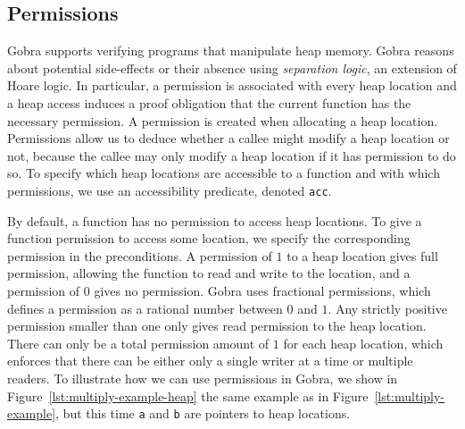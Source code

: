 \subsection{Permissions}
\label{sec:permissions}

Gobra supports verifying programs that manipulate heap memory.
Gobra reasons about potential side-effects or their absence using \emph{separation logic}, an extension of Hoare logic. 
In particular, a permission is associated with every heap location and a heap access induces a proof obligation that the current function has the necessary permission.
A permission is created when allocating a heap location.
Permissions allow us to deduce whether a callee might modify a heap location or not, because the callee may only modify a heap location if it has permission to do so.
To specify which heap locations are accessible to a function and with which permissions, we use an accessibility predicate, denoted \texttt{acc}.


By default, a function has no permission to access heap locations.
To give a function permission to access some location, we specify the corresponding permission in the preconditions.
A permission of $1$ to a heap location gives full permission, allowing the function to read and write to the location, and a permission of $0$ gives no permission.
Gobra uses fractional permissions, which defines a permission as a rational number between $0$ and $1$.
Any strictly positive permission smaller than one only gives read permission to the heap location.
There can only be a total permission amount of $1$ for each heap location, which enforces that there can be either only a single writer at a time or multiple readers.
To illustrate how we can use permissions in Gobra, we show in Figure~\ref{lst:multiply-example-heap} the same example as in Figure~\ref{lst:multiply-example}, but this time \texttt{a} and \texttt{b} are pointers to heap locations.

